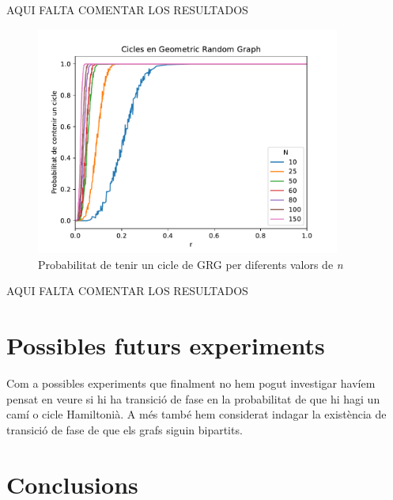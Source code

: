 AQUI FALTA COMENTAR LOS RESULTADOS

\begin{figure}[H]
    \centering
    \includegraphics[width=10cm]{plots/GRG_cicle.pdf}
    \caption{Probabilitat de tenir un cicle de GRG per diferents valors de \textit{n}}
    \label{fig:connect_04}
\end{figure}

AQUI FALTA COMENTAR LOS RESULTADOS

\section{Possibles futurs experiments}
Com a possibles experiments que finalment no hem pogut investigar havíem pensat en veure si hi ha transició de fase en la probabilitat de que hi hagi un camí o cicle Hamiltonià. A més també hem considerat indagar la existència de transició de fase de que els grafs siguin bipartits.


\section{Conclusions}

\pagebreak

\printbibliography



